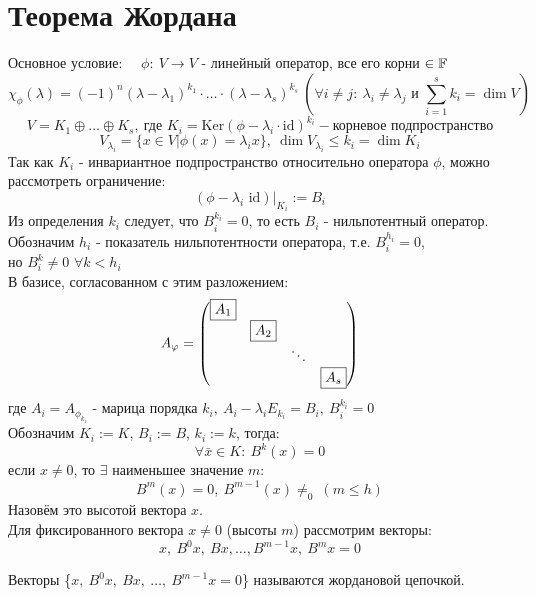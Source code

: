 \section{Теорема Жордана}
    Основное условие: \ \  $\phi: \ V \to V$ - линейный оператор, все его корни $\in \mathbb{F}$
    $$\chi_{\phi}(\lambda) = (-1)^n(\lambda-\lambda_1)^{k_1}\cdot\ldots\cdot(\lambda-\lambda_s)^{k_s} \ (\forall i\neq j: \ \lambda_i\neq\lambda_j \text{ и } \sum \limits_{i=1}^s k_i = \dim V)$$
    $$V = K_1\oplus\ldots\oplus K_s, \ \text{где } K_i = \text{Ker}(\phi-\lambda_i\cdot\text{id})^{k_i} - \text{корневое подпространство}$$
    $$V_{\lambda_i} = \{x\in V|\phi(x) = \lambda_ix\}, \  \dim V_{\lambda_i}\leqslant k_i = \dim K_i$$
    Так как $K_i$ - инвариантное подпространство относительно оператора $\phi$, можно рассмотреть ограничение: 
    $$(\phi-\lambda_i \text{ id})|_{K_i} := B_i$$
    Из определения $k_i$ следует, что $B_i^{k_i}=0$, то есть $B_i$ - нильпотентный оператор.\\
    Обозначим $h_i$ - показатель нильпотентности оператора, т.е. $B_i^{h_i}=0$,\\ 
    но $B_i^k\neq0$ $\forall k < h_i$\\
    В базисе, согласованном с этим разложением: 
    $$A_{\phi} = \begin{pmatrix}
    \text{\fbox{$A_1$}}\\
    \null & \text{\fbox{$A_2$}}\\
    \null & \null & \ddots\\
    \null & \null & \null & \text{\fbox{$A_s$}}
    \end{pmatrix}$$
    где $A_i = A_{\phi_{k_i}}$ - марица порядка $k_i, \  A_i-\lambda_iE_{k_i} = B_i, \ B_i^{k_i}=0$\\
    Обозначим $K_i :=K$, $B_i :=B$, $k_i :=k$, тогда: 
    $$\forall \bar{x}\in K: \  B^k(x) = 0$$
    если $x\neq0$, то $\exists$ наименьшее значение $m$: 
    $$B^m(x) = 0, \ B^{m-1}(x)\neq_0 \ (m\leqslant h)$$ 
    Назовём это высотой вектора $x$.\\
    Для фиксированного вектора $x\neq0$ (высоты $m$) рассмотрим векторы: 
    $$x, \ B^0x, \ Bx, \ldots,B^{m-1}x, \ B^mx = 0$$
    \begin{definition}
        Векторы \{$x,\ B^0x,\ Bx,\ \ldots,\  B^{m-1}x = 0$\} называются жордановой цепочкой.
    \end{definition}  

